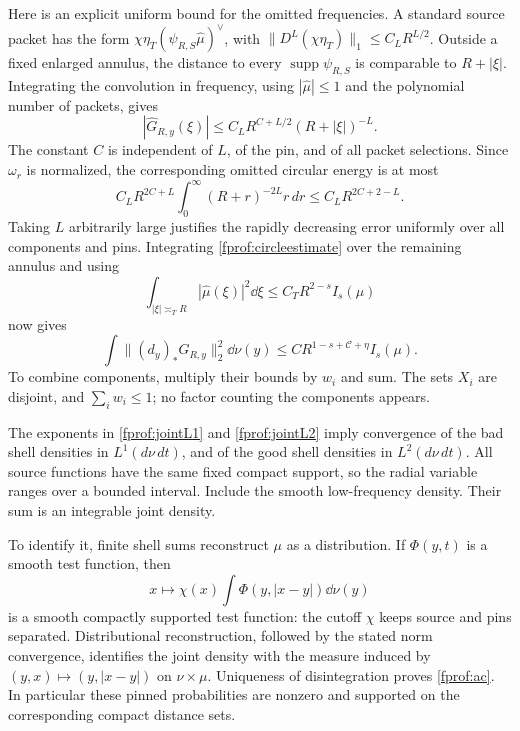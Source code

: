 Here is an explicit uniform bound for the omitted frequencies. A standard
source packet has the form
\(\chi\eta_T(\psi_{R,S}\widehat\mu)^\vee\), with
\(\|D^L(\chi\eta_T)\|_1\le C_LR^{L/2}\). Outside a fixed enlarged
annulus, the distance to every \(\operatorname{supp}\psi_{R,S}\) is
comparable to \(R+|\xi|\). Integrating the convolution in frequency,
using \(|\widehat\mu|\le1\) and the polynomial number of packets, gives
\[
 |\widehat G_{R,y}(\xi)|
 \le C_LR^{C+L/2}(R+|\xi|)^{-L}.
\]
The constant \(C\) is independent of \(L\), of the pin, and of all
packet selections. Since \(\omega_r\) is normalized, the corresponding
omitted circular energy is at most
\[
 C_LR^{2C+L}\int_0^\infty(R+r)^{-2L}r\,dr
 \le C_LR^{2C+2-L}.
\]
Taking \(L\) arbitrarily large justifies the rapidly decreasing error
uniformly over all components and pins. Integrating
\eqref{fprof:circleestimate} over the remaining annulus and using
$$
 \int_{|\xi|\asymp_T R}|\widehat\mu(\xi)|^2\dd\xi
 \leq C_T R^{2-s}I_s(\mu)
$$
now gives
\begin{equation}\label{fprof:jointL2}
 \int\|(d_y)_*G_{R,y}\|_2^2\dd\nu(y)
 \leq C R^{1-s+\mathcal C+\eta}I_s(\mu).
\end{equation}
To combine components, multiply their bounds by \(w_i\) and sum. The sets \(X_i\) are disjoint, and \(\sum_iw_i\leq1\); no factor counting the components appears.

The exponents in \eqref{fprof:jointL1} and \eqref{fprof:jointL2} imply convergence of the bad shell densities in \(L^1(d\nu\,dt)\), and of the good shell densities in \(L^2(d\nu\,dt)\). All source functions have the same fixed compact support, so the radial variable ranges over a bounded interval. Include the smooth low-frequency density. Their sum is an integrable joint density.

To identify it, finite shell sums reconstruct \(\mu\) as a distribution. If \(\Phi(y,t)\) is a smooth test function, then
$$
 x\longmapsto\chi(x)\int\Phi(y,|x-y|)\dd\nu(y)
$$
is a smooth compactly supported test function: the cutoff \(\chi\) keeps source and pins separated. Distributional reconstruction, followed by the stated norm convergence, identifies the joint density with the measure induced by \((y,x)\mapsto(y,|x-y|)\) on \(\nu\times\mu\). Uniqueness of disintegration proves \eqref{fprof:ac}. In particular these pinned probabilities are nonzero and supported on the corresponding compact distance sets.
